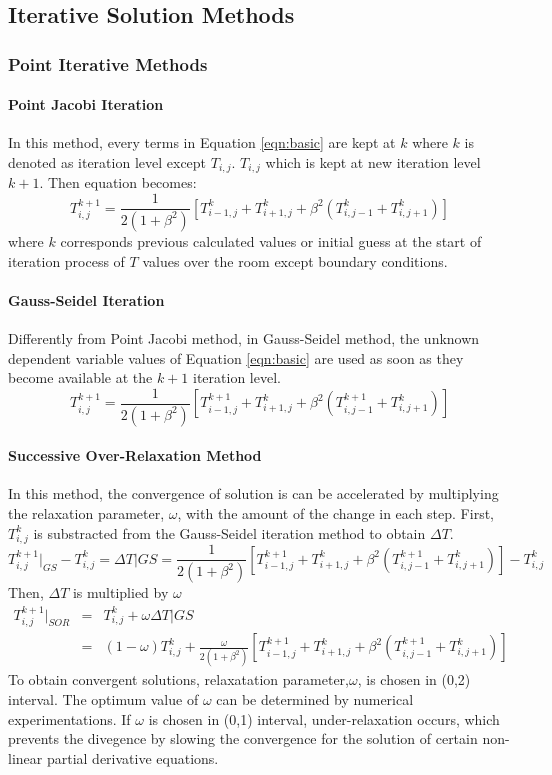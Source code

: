 \documentclass[letterpaper,12pt]{article}
\begin{document}
\subsection{Iterative Solution Methods}
\subsubsection{Point Iterative Methods}
\paragraph{Point Jacobi Iteration}
In this method, every terms in Equation \ref{eqn:basic} are kept at $k$
where $k$ is denoted as iteration level except $T_{i,j}$. $T_{i,j}$ which is kept
at new iteration level $k+1$. Then equation becomes:
\begin{equation}
	T_{i,j}^{k+1}=\frac{1}{2(1+\beta^2)}[T_{i-1,j}^{k}+T_{i+1,j}^{k}+\beta ^2(T_{i,j-1}^{k}+T_{i,j+1}^{k})]
\label{eqn:jacobi}
\end{equation}
where $k$ corresponds previous calculated values or initial guess at the start
of iteration process of $T$ values over the room except boundary conditions.
\paragraph{Gauss-Seidel Iteration}
Differently from Point Jacobi method, in Gauss-Seidel method, the unknown dependent
variable values of Equation \ref{eqn:basic} are used as soon as they become available
at the $k+1$ iteration level.
\begin{equation}
	T_{i,j}^{k+1}=\frac{1}{2(1+\beta^2)}[T_{i-1,j}^{k+1}+T_{i+1,j}^{k}+\beta ^2(T_{i,j-1}^{k+1}+T_{i,j+1}^{k})]
\label{eqn:gs}
\end{equation}
\paragraph{Successive Over-Relaxation Method}
In this method, the convergence of solution is can be accelerated by multiplying the relaxation
parameter, $\omega$, with the amount of the change in each step. First, $T_{i,j}^k$ is substracted
from the Gauss-Seidel iteration method to obtain $\Delta T$.
\begin{equation}
	T_{i,j}^{k+1}\vert_{GS}-T_{i,j}^{k}=\Delta T\vert{GS}=\frac{1}{2(1+\beta^2)}[T_{i-1,j}^{k+1}+T_{i+1,j}^{k}+\beta ^2(T_{i,j-1}^{k+1}+T_{i,j+1}^{k})]-T_{i,j}^{k}
\label{eqn:sor1}
\end{equation}
Then, $\Delta T$ is multiplied by $\omega$
\begin{eqnarray}
	T_{i,j}^{k+1}\vert_{SOR}&=&T_{i,j}^{k}+\omega\Delta T\vert{GS} \nonumber \\
	&=&(1-\omega)T_{i,j}^{k}+\frac{\omega}{2(1+\beta^2)}[T_{i-1,j}^{k+1}+T_{i+1,j}^{k}+\beta^2(T_{i,j-1}^{k+1}+T_{i,j+1}^{k})]
	\label{eqn:sor}
\end{eqnarray}
To obtain convergent solutions, relaxatation parameter,$\omega$, is chosen in (0,2) interval.
The optimum value of $\omega$ can be determined by numerical experimentations. If $\omega$ is chosen in
(0,1) interval, under-relaxation occurs, which prevents the divegence by slowing the convergence for the solution of
certain non-linear partial derivative equations.
\end{document}

